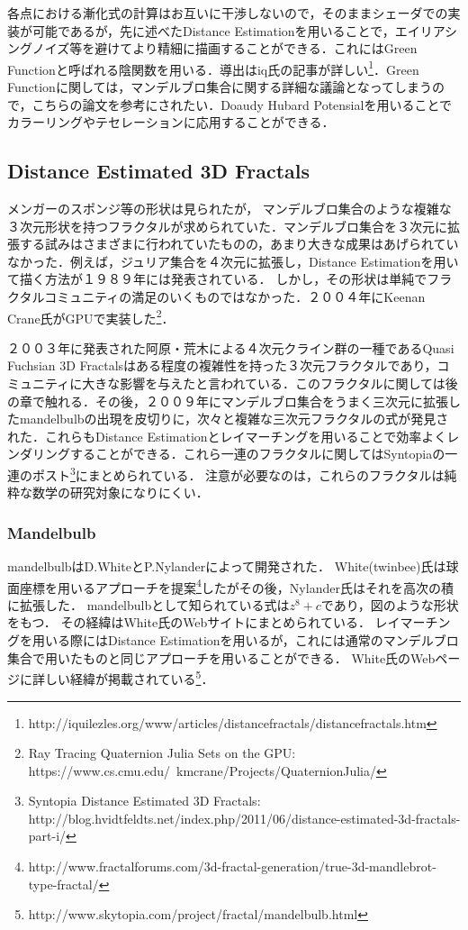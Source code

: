 各点における漸化式の計算はお互いに干渉しないので，そのままシェーダでの実装が可能であるが，先に述べたDistance Estimationを用いることで，エイリアシングノイズ等を避けてより精細に描画することができる．これにはGreen Functionと呼ばれる陰関数を用いる．導出はiq氏の記事が詳しい\footnote{http://iquilezles.org/www/articles/distancefractals/distancefractals.htm}．Green Functionに関しては，マンデルブロ集合に関する詳細な議論となってしまうので，こちらの論文\cite{mandelbrot}を参考にされたい．Doaudy Hubard Potensialを用いることでカラーリングやテセレーションに応用することができる．

\subsection{Distance Estimated 3D Fractals}

メンガーのスポンジ等の形状は見られたが，
マンデルブロ集合のような複雑な３次元形状を持つフラクタルが求められていた．マンデルブロ集合を３次元に拡張する試みはさまざまに行われていたものの，あまり大きな成果はあげられていなかった．例えば，ジュリア集合を４次元に拡張し，Distance Estimationを用いて描く方法が１９８９年には発表されている\cite{4djulia}．
しかし，その形状は単純でフラクタルコミュニティの満足のいくものではなかった．２００４年にKeenan Crane氏がGPUで実装した\footnote{Ray Tracing Quaternion Julia Sets on the GPU: https://www.cs.cmu.edu/~kmcrane/Projects/QuaternionJulia/}．

２００３年に発表された阿原・荒木\cite{sphairahedra}による４次元クライン群の一種であるQuasi Fuchsian 3D Fractalsはある程度の複雑性を持った３次元フラクタルであり，コミュニティに大きな影響を与えたと言われている．このフラクタルに関しては後の章で触れる．その後，２００９年にマンデルブロ集合をうまく三次元に拡張したmandelbulbの出現を皮切りに，次々と複雑な三次元フラクタルの式が発見された．これらもDistance Estimationとレイマーチングを用いることで効率よくレンダリングすることができる．これら一連のフラクタルに関してはSyntopiaの一連のポスト\footnote{Syntopia Distance Estimated 3D Fractals: http://blog.hvidtfeldts.net/index.php/2011/06/distance-estimated-3d-fractals-part-i/}にまとめられている．
注意が必要なのは，これらのフラクタルは純粋な数学の研究対象になりにくい．

\subsubsection{Mandelbulb}

mandelbulbはD.WhiteとP.Nylanderによって開発された．
White(twinbee)氏は球面座標を用いるアプローチを提案\footnote{http://www.fractalforums.com/3d-fractal-generation/true-3d-mandlebrot-type-fractal/}したがその後，Nylander氏はそれを高次の積に拡張した．
mandelbulbとして知られている式は$z^8 + c $であり，図のような形状をもつ．
その経緯はWhite氏のWebサイトにまとめられている．
レイマーチングを用いる際にはDistance Estimationを用いるが，これには通常のマンデルブロ集合で用いたものと同じアプローチを用いることができる．
White氏のWebページに詳しい経緯が掲載されている\footnote{http://www.skytopia.com/project/fractal/mandelbulb.html}．

